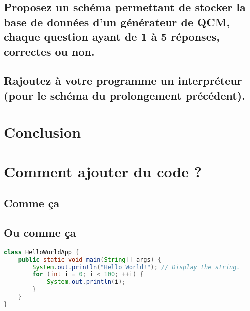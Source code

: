 \documentclass{article}
\begin{document}
\subsection{Proposez un schéma permettant de stocker la base de données d’un générateur de QCM, chaque question ayant de 1 à 5 réponses, correctes ou non.}
\subsection{Rajoutez à votre programme un interpréteur (pour le schéma du prolongement précédent).}
\section{Conclusion}

\section{Comment ajouter du code ?}
\subsection{Comme ça}


\subsection{Ou comme ça}
\begin{lstlisting}[language=java]
class HelloWorldApp {
    public static void main(String[] args) {
        System.out.println("Hello World!"); // Display the string.
        for (int i = 0; i < 100; ++i) {
            System.out.println(i);
        }
    }
}
\end{lstlisting}
\end{document}
